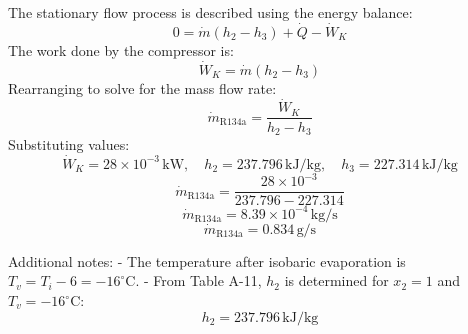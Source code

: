 The stationary flow process is described using the energy balance:  
\[
0 = \dot{m} (h_2 - h_3) + \dot{Q} - \dot{W}_K
\]  
The work done by the compressor is:  
\[
\dot{W}_K = \dot{m} (h_2 - h_3)
\]  
Rearranging to solve for the mass flow rate:  
\[
\dot{m}_{\text{R134a}} = \frac{\dot{W}_K}{h_2 - h_3}
\]  
Substituting values:  
\[
\dot{W}_K = 28 \times 10^{-3} \, \text{kW}, \quad h_2 = 237.796 \, \text{kJ/kg}, \quad h_3 = 227.314 \, \text{kJ/kg}
\]  
\[
\dot{m}_{\text{R134a}} = \frac{28 \times 10^{-3}}{237.796 - 227.314}
\]  
\[
\dot{m}_{\text{R134a}} = 8.39 \times 10^{-4} \, \text{kg/s}
\]  
\[
\dot{m}_{\text{R134a}} = 0.834 \, \text{g/s}
\]  

Additional notes:  
- The temperature after isobaric evaporation is \( T_v = T_i - 6 = -16^\circ\text{C} \).  
- From Table A-11, \( h_2 \) is determined for \( x_2 = 1 \) and \( T_v = -16^\circ\text{C} \):  
\[
h_2 = 237.796 \, \text{kJ/kg}
\]